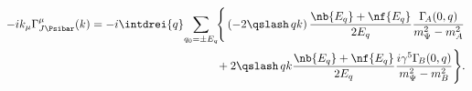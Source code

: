 \begin{equation*}
\begin{split}
-ik_\mu\Gamma_{J\smash[t]{\Psibar}}^\mu(k)
=-i\intdrei{q}\!\sum_{q_0=\pm E_q}\!&\Bigg\{\left(-2\qslash\,qk\right)
\frac{\nb{E_q}+\nf{E_q}}{2E_q}
\frac{\Gamma_{\!A}(0,q)}{m_\Psi^2-m_A^2}\\
&+2\qslash\,qk\frac{\nb{E_q}+\nf{E_q}}{2E_q}
\frac{i\gamma^5\Gamma_{\!B}(0,q)}{m_\Psi^2-m_B^2}\Bigg\}.
\end{split}
\end{equation*}

